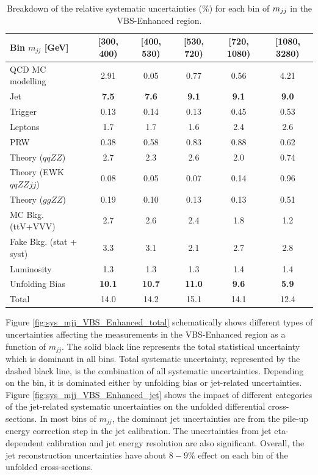 \begin{table}
\centering
\begin{tabular}{| l || c | c | c | c | c | }
\hline \hline
Bin $m_{jj}$ [GeV] & [300, 400) & [400, 530) & [530, 720) & [720, 1080) & [1080, 3280)\\
\hline
QCD MC modelling & 2.91 & 0.05 & 0.77 & 0.56 & 4.21 \\
Jet & \textbf{7.5} & \textbf{7.6} & \textbf{9.1} & \textbf{9.1} & \textbf{9.0}\\
Trigger & 0.13 & 0.14 & 0.13 & 0.45 & 0.53\\
Leptons & 1.7 & 1.7 & 1.6 & 2.4 & 2.6 \\
PRW & 0.38 & 0.58 & 0.83 & 0.88 & 0.62\\
Theory ($qqZZ$) & 2.7 & 2.3 & 2.6 & 2.0 & 0.74\\
Theory (EWK $qqZZjj$) & 0.08 & 0.05 & 0.07 & 0.14 & 0.96\\
Theory ($ggZZ$) & 0.19 & 0.10 & 0.13 & 0.13 & 0.51\\
MC Bkg. (ttV+VVV) & 2.7 & 2.6 & 2.4 & 1.8 & 1.2\\
Fake Bkg. (stat + syst) & 3.3 & 3.1 & 2.1 & 2.7 & 2.8\\
Luminosity & 1.3 & 1.3 & 1.3 & 1.4 & 1.4\\
Unfolding Bias & \textbf{10.1} & \textbf{10.7} & \textbf{11.0} & \textbf{9.6} & \textbf{5.9}\\
\hline
Total & 14.0 & 14.2 & 15.1 & 14.1 & 12.4\\
\hline
\end{tabular}
\caption{Breakdown of the relative systematic uncertainties ($\%$) for each bin of $m_{jj}$ in the VBS-Enhanced region. \label{tab:systematics_mjj_VBS_Enhanced}}
\end{table}

Figure \ref{fig:sys_mjj_VBS_Enhanced_total} schematically shows different types of uncertainties affecting the measurements in the VBS-Enhanced region as a function of $m_{jj}$. The solid black line represents the total statistical uncertainty which is dominant in all bins. Total systematic uncertainty, represented by the dashed black line, is the combination of all systematic uncertainties. Depending on the bin, it is dominated either by unfolding bias or jet-related uncertainties. Figure \ref{fig:sys_mjj_VBS_Enhanced_jet} shows the impact of different categories of the jet-related systematic uncertainties on the unfolded differential cross-sections. In most bins of $m_{jj}$, the dominant jet uncertainties are from the pile-up energy correction step in the jet calibration. The uncertainties from jet eta-dependent calibration and jet energy resolution are also significant. Overall, the jet reconstruction uncertainties have about $8-9\%$ effect on each bin of the unfolded cross-sections.

